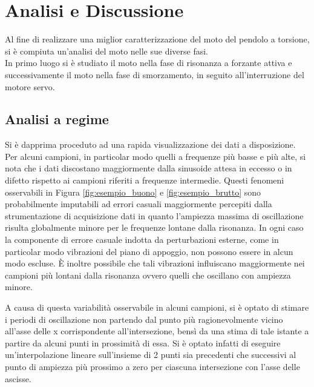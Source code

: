 \documentclass[a4paper,11pt,oneside]{article}
\begin{document}
\section{Analisi e Discussione}
Al fine di realizzare una miglior caratterizzazione del moto del pendolo a torsione, si è compiuta un'analisi del moto nelle sue diverse fasi.\\
In primo luogo si è studiato il moto nella fase di risonanza a forzante attiva e successivamente il moto nella fase di smorzamento, in seguito all'interruzione del motore servo.

\subsection{Analisi a regime}
Si è dapprima proceduto ad una rapida visualizzazione dei dati a disposizione.
Per alcuni campioni, in particolar modo quelli a frequenze più basse e più alte, si nota che i dati discostano maggiormente dalla sinusoide attesa in eccesso o in difetto rispetto ai campioni riferiti a frequenze intermedie.
Questi fenomeni osservabili in Figura \ref{fig:esempio_buono} e \ref{fig:esempio_brutto} sono probabilmente imputabili ad errori casuali maggiormente percepiti dalla strumentazione di acquisizione dati in quanto l'ampiezza massima di oscillazione risulta globalmente minore per le frequenze lontane dalla risonanza.
In ogni caso la componente di errore casuale indotta da perturbazioni esterne, come in particolar modo vibrazioni del piano di appoggio, non possono essere in alcun modo escluse. È inoltre possibile che tali vibrazioni influiscano maggiormente nei campioni più lontani dalla risonanza ovvero quelli che oscillano con ampiezza minore.



\begin{figure}[h!]
    \centering
    \caption*{}
\end{figure}


A causa di questa variabilità osservabile in alcuni campioni, si è optato di stimare i periodi di oscillazione non partendo dal punto più ragionevolmente vicino all'asse delle x corrispondente all'intersezione, bensì da una stima di tale istante a partire da alcuni punti in prossimità di essa. Si è optato infatti di eseguire un'interpolazione lineare sull'insieme di 2 punti sia precedenti che successivi al punto di ampiezza più prossimo a zero per ciascuna intersezione con l'asse delle ascisse.
\end{document}

